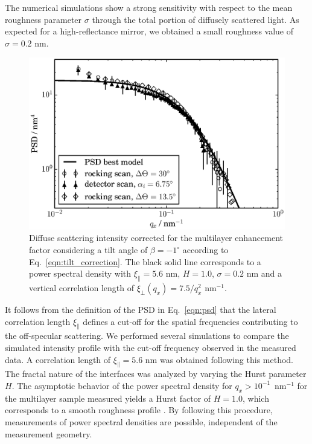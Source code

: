 \documentclass[twocolumn,osajnl,showpacs,superscriptaddress,11pt]{revtex4-1}
\begin{document}
The numerical simulations show a strong sensitivity with respect to the mean roughness parameter $\sigma$ through the total portion of diffusely scattered light. As expected for a high-reflectance mirror, we obtained a small roughness value of $\sigma = 0.2$ nm.
\begin{figure}
	\includegraphics[width=0.5
	\textwidth]{PSD_zoomed} \caption{Diffuse scattering intensity corrected for the multilayer enhancement factor considering a tilt angle of $\beta=-1^{\circ}$ according to Eq.~\eqref{eqn:tilt_correction}. The black solid line corresponds to a power spectral density with $\xi_\parallel=5.6$ nm, $H=1.0$, $\sigma=0.2$ nm and a vertical correlation length of $\xi_\perp(q_x)=7.5/q_x^2$ nm$^{-1}$.} \label{fig:PSDs_linear} 
\end{figure}

It follows from the definition of the PSD in Eq.~\eqref{eqn:psd} that the lateral correlation length $\xi_\parallel$ defines a cut-off for the spatial frequencies contributing to the off-specular scattering. We performed several simulations to compare the simulated intensity profile with the cut-off frequency observed in the measured data. A correlation length of $\xi_\parallel=5.6$ nm was obtained following this method. The fractal nature of the interfaces was analyzed by varying the Hurst parameter $H$. The asymptotic behavior of the power spectral density for $q_x>10^{-1}$~nm$^{-1}$ for the multilayer sample measured yields a Hurst factor of $H=1.0$, which corresponds to a smooth roughness profile \cite{PhysRevB.38.2297}. By following this procedure, measurements of power spectral densities are possible, independent of the measurement geometry.
\end{document}
